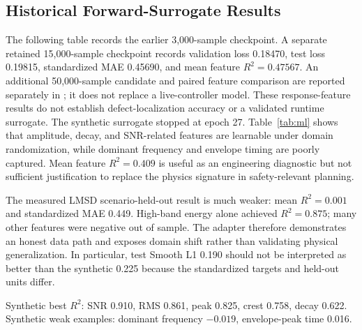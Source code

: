 \documentclass[conference]{IEEEtran}
\begin{document}
\subsection{Historical Forward-Surrogate Results}
The following table records the earlier 3,000-sample checkpoint. A separate retained 15,000-sample checkpoint records validation loss 0.18470, test loss 0.19815, standardized MAE 0.45690, and mean feature $R^2=0.47567$. An additional 50,000-sample candidate and paired feature comparison are reported separately in ; it does not replace a live-controller model. These response-feature results do not establish defect-localization accuracy or a validated runtime surrogate.
The synthetic surrogate stopped at epoch 27. Table~\ref{tab:ml} shows that amplitude, decay, and SNR-related features are learnable under domain randomization, while dominant frequency and envelope timing are poorly captured. Mean feature $R^2=0.409$ is useful as an engineering diagnostic but not sufficient justification to replace the physics signature in safety-relevant planning.

The measured LMSD scenario-held-out result is much weaker: mean $R^2=0.001$ and standardized MAE 0.449. High-band energy alone achieved $R^2=0.875$; many other features were negative out of sample. The adapter therefore demonstrates an honest data path and exposes domain shift rather than validating physical generalization. In particular, test Smooth L1 0.190 should not be interpreted as better than the synthetic 0.225 because the standardized targets and held-out units differ.

\begin{table}[t]
\caption{Learned Forward-Response Evaluation}
\label{tab:ml}
\centering
\small
{}
\vspace{1mm}

\footnotesize Synthetic best $R^2$: SNR 0.910, RMS 0.861, peak 0.825, crest 0.758, decay 0.622. Synthetic weak examples: dominant frequency $-0.019$, envelope-peak time 0.016.
\end{table}
\end{document}
